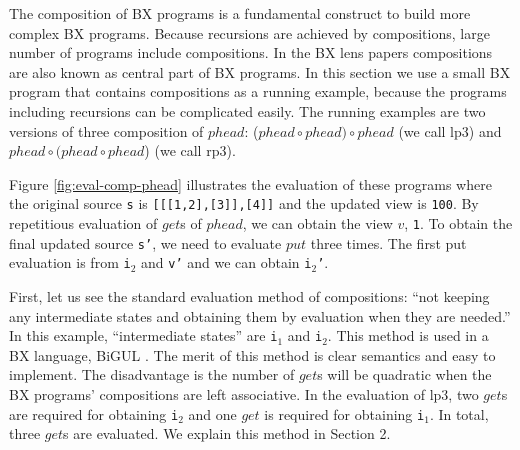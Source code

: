 The composition of BX programs is a fundamental construct to build more complex BX programs. 
Because recursions are achieved by compositions, large number of programs include compositions.
In the BX lens papers \cite{} compositions are also known as central part of BX programs.
In this section we use a small BX program that contains compositions as a running example, because the programs including recursions can be complicated easily. The running examples are two versions of three composition of $phead$: ($phead \circ phead) \circ phead$ (we call lp3) and $phead \circ (phead \circ phead$) (we call rp3).



Figure \ref{fig:eval-comp-phead} illustrates the evaluation of these programs where the original source \texttt{s} is \texttt{[[[1,2],[3]],[4]]} and the updated view is \texttt{100}.
By repetitious evaluation of $get$s of $phead$, we can obtain the view $v$, \texttt{1}. To obtain the final updated source \texttt{s'}, we need to evaluate $put$ three times. The first put evaluation is from \texttt{i$_2$} and \texttt{v'} and we can obtain \texttt{i$_2$'}.

First, let us see the standard evaluation method of compositions: ``not keeping any intermediate states and obtaining them by evaluation when they are needed.'' In this example, ``intermediate states'' are \texttt{i$_1$} and \texttt{i$_2$}. This method is used in a BX language, BiGUL \cite{josh_pepm} \cite{josh_popl}. The merit of this method is clear semantics and easy to implement. The disadvantage is the number of $get$s will be quadratic when the BX programs' compositions are left associative. In the evaluation of lp3, two $get$s are required for obtaining \texttt{i$_2$} and one $get$ is required for obtaining \texttt{i$_1$}. In total, three $get$s are evaluated. We explain this method in Section 2.

